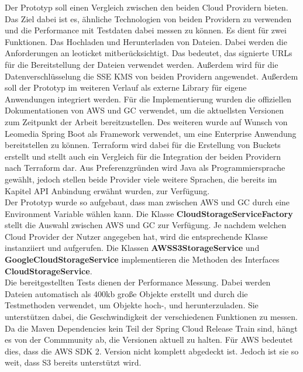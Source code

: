 Der Prototyp soll einen Vergleich zwischen den beiden Cloud Providern bieten. Das Ziel dabei ist es, ähnliche Technologien von beiden Providern zu verwenden und die Performance mit Testdaten dabei messen zu können. Es dient für zwei Funktionen. Das Hochladen und Herunterladen von Dateien. Dabei werden die Anforderungen an leoticket mitberücksichtigt. Das bedeutet, das signierte URLs für die Bereitstellung der Dateien verwendet werden. Außerdem wird für die Datenverschlüsselung die SSE KMS von beiden Providern angewendet. Außerdem soll der Prototyp im weiteren Verlauf als externe Library für eigene Anwendungen integriert werden. Für die Implementierung wurden die offiziellen Dokumentationen von AWS und GC verwendet, um die aktuellsten Versionen zum Zeitpunkt der Arbeit bereitzustellen. Des weiteren wurde auf Wunsch von Leomedia Spring Boot als Framework verwendet, um eine Enterprise Anwendung bereitstellen zu können. Terraform wird dabei für die Erstellung von Buckets erstellt und stellt auch ein Vergleich für die Integration der beiden Providern nach Terraform dar. Aus Preferenzgründen wird Java als Programmiersprache gewählt, jedoch stellen beide Provider viele weitere Sprachen, die bereits im Kapitel API Anbindung erwähnt wurden, zur Verfügung.\\

Der Prototyp wurde so aufgebaut, dass man zwischen AWS und GC durch eine Environment Variable wählen kann. Die Klasse \textbf{CloudStorageServiceFactory} stellt die Auswahl zwischen AWS und GC zur Verfügung. Je nachdem welchen Cloud Provider der Nutzer angegeben hat, wird die entsprechende Klasse instanziiert und aufgerufen. Die Klassen \textbf{AWSS3StorageService} und \textbf{GoogleCloudStorageService} implementieren die Methoden des Interfaces \textbf{CloudStorageService}.\\

Die bereitgestellten Tests dienen der Performance Messung. Dabei werden Dateien automatisch als 400kb große Objekte erstellt und durch die Testmethoden verwendet, um Objekte hoch-, und herunterzuladen. Sie unterstützen dabei, die Geschwindigkeit der verschiedenen Funktionen zu messen.\\

Da die Maven Dependencies kein Teil der Spring Cloud Release Train sind, hängt es von der Commmunity ab, die Versionen aktuell zu halten. Für AWS bedeutet dies, dass die AWS SDK 2. Version nicht komplett abgedeckt ist. Jedoch ist sie so weit, dass S3 bereits unterstützt wird. 

